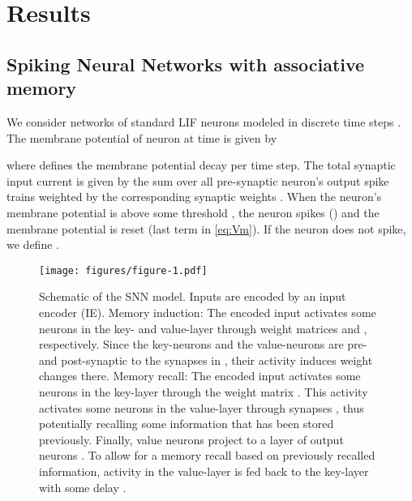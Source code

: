 \documentclass{article}
\begin{document}
\section{Results}
\label{sec:results}

\subsection{Spiking Neural Networks with associative memory}
\label{sec:results-model}
We consider networks of standard \gls{LIF} neurons modeled in discrete time steps . The membrane potential  of neuron  at time  is given by

where  defines the membrane potential decay per time step. The total synaptic input current  is given by the sum over all pre-synaptic neuron's output spike trains weighted by the corresponding synaptic weights . When the neuron's membrane potential  is above some threshold , the neuron spikes () and the membrane potential is reset (last term in \eqref{eq:Vm}). If the neuron does not spike, we define .

\begin{figure}\centering
\texttt{[image: figures/figure-1.pdf]}
\caption{Schematic of the SNN model. Inputs  are encoded by an input encoder (IE). Memory induction: The encoded input  activates some neurons in the key- and value-layer through weight matrices  and , respectively. Since the key-neurons  and the value-neurons  are pre- and post-synaptic to the synapses in , their activity induces weight changes there. Memory recall: The encoded input  activates some neurons in the key-layer through the weight matrix . This activity activates some neurons in the value-layer through synapses , thus potentially recalling some information that has been stored previously. Finally, value neurons  project to a layer of output neurons . To allow for a memory recall based on previously recalled information, activity in the value-layer is fed back to the key-layer with some delay .
}
\label{fig:fig1}
\end{figure}
\end{document}
